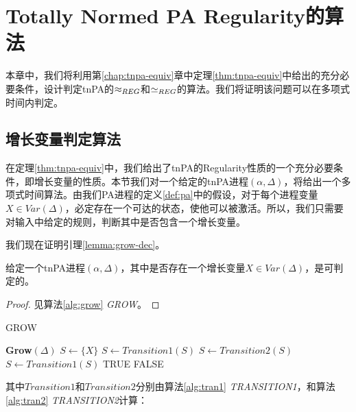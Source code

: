\chapter{Totally Normed PA Regularity的算法}
\label{chap:tnpa-alg}

本章中，我们将利用第\ref{chap:tnpa-equiv}章中定理\ref{thm:tnpa-equiv}中给出的充分必要条件，设计判定tnPA的$\approx_{REG}$和$\simeq_{REG}$的算法。我们将证明该问题可以在多项式时间内判定。

\section{增长变量判定算法}
\label{sec:grow-alg}

在定理\ref{thm:tnpa-equiv}中，我们给出了tnPA的Regularity性质的一个充分必要条件，即增长变量的性质。本节我们对一个给定的tnPA进程$(\alpha,\Delta)$，将给出一个多项式时间算法。由我们PA进程的定义\ref{def:pa}中的假设，对于每个进程变量$X\in Var(\Delta)$，必定存在一个可达的状态，使他可以被激活。所以，我们只需要对输入中给定的规则，判断其中是否包含一个增长变量。

我们现在证明引理\ref{lemma:grow-dec}。

\begin{lem}\label{lemma:grow-dec}
给定一个tnPA进程$(\alpha,\Delta)$，其中是否存在一个增长变量$X\in Var(\Delta)$，是可判定的。
\end{lem}

\begin{proof}
见算法\ref{alg:grow} \textsl{GROW}。
\end{proof}

\begin{algorithm}[htbp]
\caption{GROW}
\label{alg:grow}
\begin{algorithmic}[1]
\Statex \textbf{Grow$(\Delta)$ }
    \State $S\leftarrow \{X\}$
        \State $S\leftarrow Transition1(S)$
    \EndWhile
    \State $S\leftarrow Transition2(S)$
        \State $S\leftarrow Transition1(S)$
    \EndWhile
        \State \Return TRUE
    \EndIf
\EndFor
\State \Return FALSE

\end{algorithmic}
\end{algorithm}

其中$Transition1$和$Transition2$分别由算法\ref{alg:tran1} \textsl{TRANSITION1}，和算法\ref{alg:tran2} \textsl{TRANSITION2}计算：

